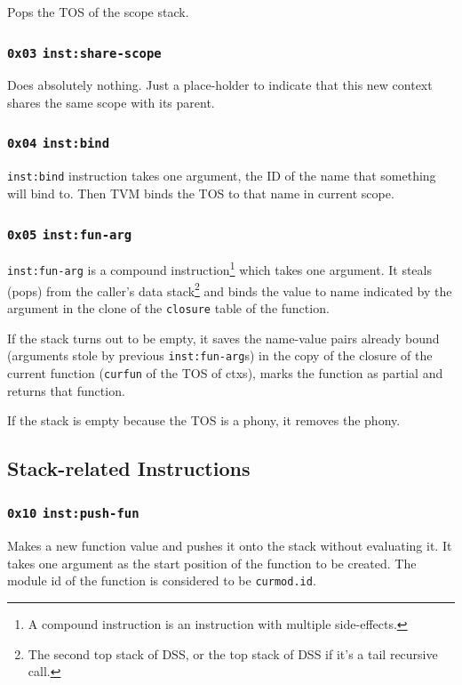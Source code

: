 \documentclass{article}
\newcommand{\inst}[1] {\texttt{inst:#1}}
\begin{document}
Pops the TOS of the scope stack.

\subsubsection{\texttt{0x03} \inst{share-scope}}

Does absolutely nothing. Just a place-holder to indicate that this new context shares the same scope with its parent.

\subsubsection{\texttt{0x04} \inst{bind}}

\inst{bind} instruction takes one argument, the ID of the name that something will bind to. Then TVM binds the TOS to that name in current scope.

\subsubsection{\texttt{0x05} \inst{fun-arg}}

\inst{fun-arg} is a compound instruction\footnote{A compound instruction is an instruction with multiple side-effects.} which takes one argument. It steals (pops) from the caller's data stack\footnote{The second top stack of DSS, or the top stack of DSS if it's a tail recursive call.} and binds the value to name indicated by the argument in the clone of the \texttt{closure} table of the function.

If the stack turns out to be empty, it saves the name-value pairs already bound (arguments stole by previous \inst{fun-arg}s) in the copy of the closure of the current function (\texttt{curfun} of the TOS of ctxs), marks the function as partial and returns that function.

If the stack is empty because the TOS is a phony, it removes the phony.

\subsection{Stack-related Instructions}

\subsubsection{\texttt{0x10} \inst{push-fun}}

Makes a new function value and pushes it onto the stack without evaluating it. It takes one argument as the start position of the function to be created. The module id of the function is considered to be \texttt{curmod.id}.
\end{document}

